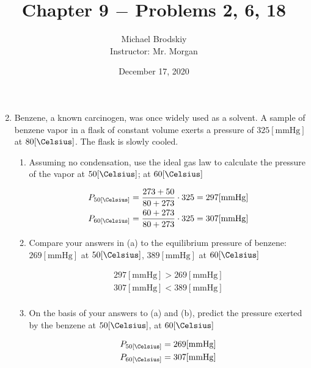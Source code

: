 \documentclass[12pt]{article}
\title{Chapter 9 $-$ Problems 2, 6, 18}
\date{December 17, 2020}
\author{Michael Brodskiy\\ \small Instructor: Mr. Morgan}
\begin{document}
\maketitle

\begin{enumerate}

    \setcounter{enumi}{1}

  \item Benzene, a known carcinogen, was once widely used as a solvent. A sample of benzene vapor in a flask of constant volume exerts a pressure of $325[\si{\mmHg}]$ at $80[\si{\Celsius}]$. The flask is slowly cooled.

    \begin{enumerate}

      \item Assuming no condensation, use the ideal gas law to calculate the pressure of the vapor at $50[\si{\Celsius}]$; at $60[\si{\Celsius}]$

        \begin{equation}
          \begin{split}
            P_{50[\si{\Celsius}]}&=\frac{273+50}{80+273}\cdot325=297[\si{\mmHg}]\\
            P_{60[\si{\Celsius}]}&=\frac{60+273}{80+273}\cdot325=307[\si{\mmHg}]\\
          \end{split}
          \label{1}
        \end{equation}

      \item Compare your answers in (a) to the equilibrium pressure of benzene: $269[\si{\mmHg}]$ at $50[\si{\Celsius}]$, $389[\si{\mmHg}]$ at $60[\si{\Celsius}]$

        \begin{equation}
          \begin{split}
            297[\si{\mmHg}]>269[\si{\mmHg}]\\
            307[\si{\mmHg}]<389[\si{\mmHg}]\\
          \end{split}
          \label{2}
        \end{equation}

      \item On the basis of your answers to (a) and (b), predict the pressure exerted by the benzene at $50[\si{\Celsius}]$, at $60[\si{\Celsius}]$

        \begin{equation}
          \begin{split}
            P_{50[\si{\Celsius}]}&=269[\si{\mmHg}]\\
            P_{60[\si{\Celsius}]}&=307[\si{\mmHg}]\\
          \end{split}
          \label{3}
        \end{equation}


\end{enumerate}
\end{enumerate}
\end{document}
